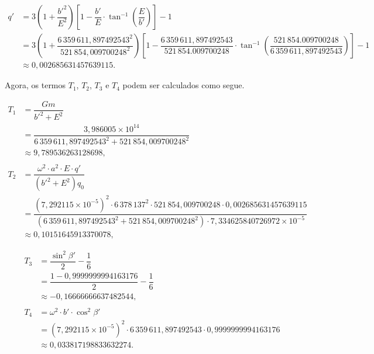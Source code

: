 \[
\begin{aligned}
   q'&= 3\left(1 + \dfrac{b'^2}{E^2}\right)\left[1 -\dfrac{b'}{E} \cdot \tan^{-1}\left(\dfrac{E}{b'}\right)\right] -1\\
     &= 3\left(1 + \dfrac{6\,359\,611{,}897492543^2}{521\,854{,}009700248^2}\right)\left[1 -\dfrac{6\,359\,611{,}897492543}{521\,854.009700248} \cdot \tan^{-1}\left(\dfrac{521\,854.009700248}{6\,359\,611{,}897492543}\right)\right] -1\\
     &\approx 0{,}002685631457639115 \text{.}
\end{aligned}
\]

\noindent
Agora, os termos \(T_1\), \(T_2\), \(T_3\) e \(T_4\) podem ser calculados como segue.

\begin{flushleft}
   \begin{align*}
      T_1 &= \dfrac{Gm}{b'^2 + E^2} \\
          &= \dfrac{3{,}986005 \times 10^{14}}{6\,359\,611{,}897492543^2 + 521\,854{,}009700248^2} \\
          &\approx 9{,}789536263128698 \text{,} \\
   \\
      T_2 &= \dfrac{\omega^2 \cdot a^2 \cdot E \cdot q'}{(b'^2 + E^2)q_0} \\
          &= \dfrac{(7{,}292115 \times 10^{-5})^2 \cdot 6\,378\,137^2 \cdot 521\,854{,}009700248 \cdot 0{,}002685631457639115}{(6\,359\,611{,}897492543^2 + 521\,854{,}009700248^2) \cdot 7{,}334625840726972 \times 10^{-5}} \\
          &\approx 0{,}10151645913370078 \text{,} 
   \end{align*}
   \end{flushleft}


   \begin{flushleft}
      \begin{align*}
         T_3 &= \dfrac{\sin^2\beta'}{2} - \dfrac{1}{6} \\
             &= \dfrac{1 - 0{,}9999999994163176}{2} - \dfrac{1}{6} \\
             &\approx -0{,}16666666637482544 \text{,} \\
      \\
         T_4 &= \omega^2 \cdot b' \cdot \cos^2\beta' \\
             &= (7{,}292115 \times 10^{-5})^2 \cdot 6\,359\,611{,}897492543 \cdot 0{,}9999999994163176 \\
             &\approx 0{,}033817198833632274 \text{.}
      \end{align*}
\end{flushleft}
   
